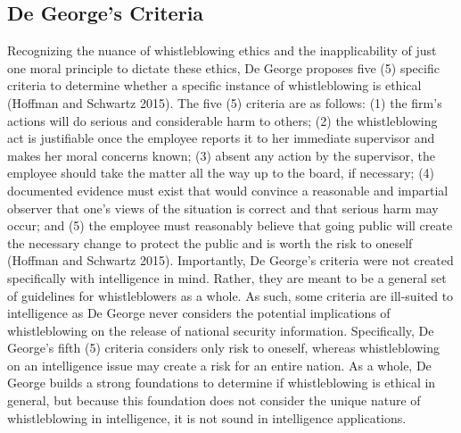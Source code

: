 \documentclass [12 pt] {article}
\begin{document}
\subsection{De George's Criteria}
Recognizing the nuance of whistleblowing ethics and the inapplicability of just one moral principle to dictate these ethics, De George proposes five (5) specific criteria to determine whether a specific instance of whistleblowing is ethical (Hoffman and Schwartz 2015). The five (5) criteria are as follows: (1) the firm's actions will do serious and considerable harm to others; (2) the whistleblowing act is justifiable once the employee reports it to her immediate supervisor and makes her moral concerns known; (3) absent any action by the supervisor, the employee should take the matter all the way up to the board, if necessary; (4) documented evidence must exist that would convince a reasonable and impartial observer that one's views of the situation is correct and that serious harm may occur; and (5) the employee must reasonably believe that going public will create the necessary change to protect the public and is worth the risk to oneself (Hoffman and Schwartz 2015).
\bigbreak
Importantly, De George's criteria were not created specifically with intelligence in mind. Rather, they are meant to be a general set of guidelines for whistleblowers as a whole. As such, some criteria are ill-suited to intelligence as De George never considers the potential implications of whistleblowing on the release of national security information. Specifically, De George's fifth (5) criteria considers only risk to oneself, whereas whistleblowing on an intelligence issue may create a risk for an entire nation. As a whole, De George builds a strong foundations to determine if whistleblowing is ethical in general, but because this foundation does not consider the unique nature of whistleblowing in intelligence, it is not sound in intelligence applications.
\end{document}
